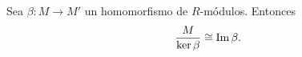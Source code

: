 %
\begin{teorema}
	 \label{teo:first-iso} Sea $\beta : M \to M'$ un homomorfismo
	de $R$-módulos. Entonces
	\[
	\frac{M}{\ker \beta}\cong \operatorname{Im} \beta.
	\]
\end{teorema}
%
